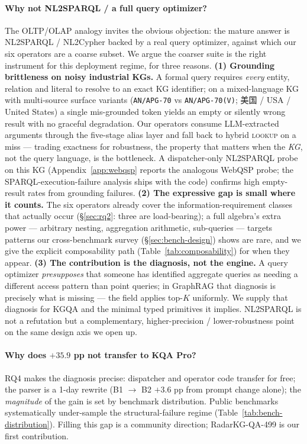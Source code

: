 \documentclass[11pt,a4paper]{article}
\newcommand{\op}[1]{\textsc{\small #1}}
\begin{document}
\paragraph{Why not NL2SPARQL / a full query optimizer?}
The OLTP/OLAP analogy invites the obvious objection: the mature answer is NL2SPARQL / NL2Cypher backed by a real query optimizer, against which our six operators are a coarse subset. We argue the coarser suite is the right instrument for this deployment regime, for three reasons. \textbf{(1) Grounding brittleness on noisy industrial KGs.} A formal query requires \emph{every} entity, relation and literal to resolve to an exact KG identifier; on a mixed-language KG with multi-source surface variants (\texttt{AN/APG-70} vs \texttt{AN/APG-70(V)}; 美国 / USA / United States) a single mis-grounded token yields an empty or silently wrong result with no graceful degradation. Our operators consume LLM-extracted arguments through the five-stage alias layer and fall back to hybrid \op{lookup} on a miss --- trading exactness for robustness, the property that matters when the \emph{KG}, not the query language, is the bottleneck. A dispatcher-only NL2SPARQL probe on this KG (Appendix~\ref{app:webqsp} reports the analogous WebQSP probe; the SPARQL-execution-failure analysis ships with the code) confirms high empty-result rates from grounding failures. \textbf{(2) The expressive gap is small where it counts.} The six operators already cover the information-requirement classes that actually occur (§\ref{sec:rq2}: three are load-bearing); a full algebra's extra power --- arbitrary nesting, aggregation arithmetic, sub-queries --- targets patterns our cross-benchmark survey (§\ref{sec:bench-design}) shows are rare, and we give the explicit composability path (Table~\ref{tab:composability}) for when they appear. \textbf{(3) The contribution is the diagnosis, not the engine.} A query optimizer \emph{presupposes} that someone has identified aggregate queries as needing a different access pattern than point queries; in GraphRAG that diagnosis is precisely what is missing --- the field applies top-$K$ uniformly. We supply that diagnosis for KGQA and the minimal typed primitives it implies. NL2SPARQL is not a refutation but a complementary, higher-precision / lower-robustness point on the same design axis we open up.

\paragraph{Why does \texorpdfstring{$+35.9$}{+35.9} pp not transfer to KQA Pro?}
RQ4 makes the diagnosis precise: dispatcher and operator code transfer for free; the parser is a 1-day rewrite (B1 $\to$ B2 $+3.6$ pp from prompt change alone); the \emph{magnitude} of the gain is set by benchmark distribution. Public benchmarks systematically under-sample the structural-failure regime (Table~\ref{tab:bench-distribution}). Filling this gap is a community direction; RadarKG-QA-499 is our first contribution.
\end{document}
